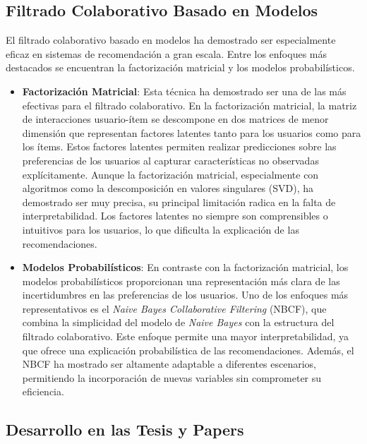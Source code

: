 \documentclass[twocolumn, fontsize=10pt]{article}
\begin{document}
 
\subsection{Filtrado Colaborativo Basado en Modelos}
 
El filtrado colaborativo basado en modelos ha 
demostrado ser especialmente eficaz en sistemas de 
recomendación a gran escala. Entre los enfoques más 
destacados se encuentran la factorización matricial y
los modelos probabilísticos.

\begin{itemize}
    \item \textbf{Factorización Matricial}:
    Esta técnica ha demostrado ser una de las más 
    efectivas para el filtrado colaborativo. 
    En la factorización matricial, la matriz de 
    interacciones usuario-ítem se descompone en dos 
    matrices de menor dimensión que representan 
    factores latentes tanto para los usuarios como 
    para los ítems. Estos factores latentes permiten 
    realizar predicciones sobre las preferencias de 
    los usuarios al capturar características no 
    observadas explícitamente. Aunque la factorización 
    matricial, especialmente con algoritmos como la 
    descomposición en valores singulares (SVD), 
    ha demostrado ser muy precisa, su principal 
    limitación radica en la falta de interpretabilidad. 
    Los factores latentes no siempre son comprensibles
    o intuitivos para los usuarios, lo que dificulta
    la explicación de las recomendaciones. \cite{tesis_sistema_recomendador_hibrido}
    \item \textbf{Modelos Probabilísticos}:
    En contraste con la factorización matricial, 
    los modelos probabilísticos proporcionan una 
    representación más clara de las incertidumbres 
    en las preferencias de los usuarios. Uno de los 
    enfoques más representativos es el \textit{Naive Bayes 
    Collaborative Filtering} (NBCF), que combina la 
    simplicidad del modelo de \textit{Naive Bayes} con la 
    estructura del filtrado colaborativo. Este 
    enfoque permite una mayor interpretabilidad, 
    ya que ofrece una explicación probabilística de 
    las recomendaciones. Además, el NBCF ha mostrado 
    ser altamente adaptable a diferentes escenarios, 
    permitiendo la incorporación de nuevas variables 
    sin comprometer su eficiencia. \cite{tesis_sistema_recomendador_hibrido}

\end{itemize}

\subsection{Desarrollo en las Tesis y Papers} 
\end{document}
